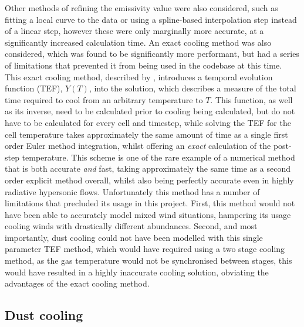 Other methods of refining the emissivity value were also considered, such as fitting a local curve to the data or using a spline-based interpolation step instead of a linear step, however these were only marginally more accurate, at a significantly increased calculation time. 
An exact cooling method was also considered, which was found to be significantly more performant, but had a series of limitations that prevented it from being used in the codebase at this time.
This exact cooling method, described by \textcite{townsendExactIntegrationScheme2009}, introduces a temporal evolution function (TEF), $Y(T)$, into the solution, which describes a measure of the total time required to cool from an arbitrary temperature to $T$.
This function, as well as its inverse, need to be calculated prior to cooling being calculated, but do not have to be calculated for every cell and timestep, while solving the TEF for the cell temperature takes approximately the same amount of time as a single first order Euler method integration, whilst offering an \textit{exact} calculation of the post-step temperature.
This scheme is one of the rare example of a numerical method that is both accurate \textit{and} fast, taking approximately the same time as a second order explicit method overall, whilst also being perfectly accurate even in highly radiative hypersonic flows.
Unfortunately this method has a number of limitations that precluded its usage in this project.
First, this method would not have been able to accurately model mixed wind situations, hampering its usage cooling winds with drastically different abundances.
Second, and most importantly, dust cooling could not have been modelled with this single parameter TEF method, which would have required using a two stage cooling method, as the gas temperature would not be synchronised between stages, this would have resulted in a highly inaccurate cooling solution, obviating the advantages of the exact cooling method.

\subsection{Dust cooling}
\label{sec:dustcoolingmodel}


